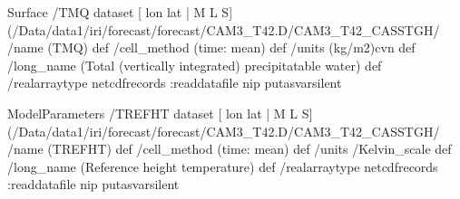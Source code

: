 \begin{ingrid}

Surface /TMQ{
dataset
[ lon lat | M L S] (/Data/data1/iri/forecast/forecast/CAM3_T42.D/CAM3_T42_CASSTGH/%
/name (TMQ) def
 /cell_method (time: mean) def
 /units (kg/m2)cvn def
 /long_name (Total (vertically integrated) precipitatable water) def
 /realarraytype netcdfrecords :readdatafile
nip
}putasvarsilent



ModelParameters /TREFHT{
dataset
[ lon lat | M L S] (/Data/data1/iri/forecast/forecast/CAM3_T42.D/CAM3_T42_CASSTGH/%
/name (TREFHT) def
 /cell_method (time: mean) def
 /units /Kelvin_scale def
 /long_name (Reference height temperature) def
 /realarraytype netcdfrecords :readdatafile
nip
}putasvarsilent


\end{ingrid}
